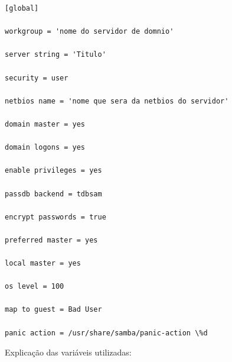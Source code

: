 \begin{lstlisting}[caption=Exemplo do que deve ser inserido no smb.conf,label={smb_global}]
[global] 

workgroup = 'nome do servidor de domnio'

server string = 'Titulo'       

security = user

netbios name = 'nome que sera da netbios do servidor'

domain master = yes

domain logons = yes

enable privileges = yes

passdb backend = tdbsam
	
encrypt passwords = true

preferred master = yes

local master = yes

os level = 100

map to guest = Bad User

panic action = /usr/share/samba/panic-action \%d	
\end{lstlisting}

Explicação das variáveis utilizadas:

